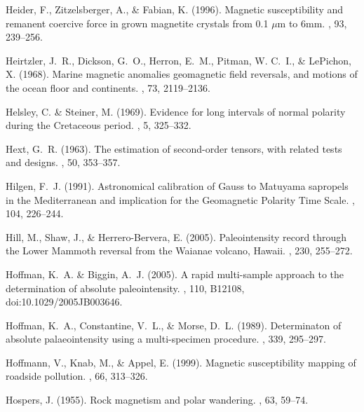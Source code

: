 \documentclass[11pt]{book}
\begin{document}
\begin{thebibliography}{}
Heider, F., Zitzelsberger, A., \& Fabian, K. (1996).
\newblock Magnetic susceptibility and remanent coercive force in grown
  magnetite crystals from 0.1 $\mu$m to 6mm.
, 93, 239--256.

Heirtzler, J.~R., Dickson, G.~O., Herron, E.~M., Pitman, W. C.~I., \& LePichon,
  X. (1968).
\newblock Marine magnetic anomalies geomagnetic field reversals, and motions of
  the ocean floor and continents.
, 73, 2119--2136.

Helsley, C. \& Steiner, M. (1969).
\newblock Evidence for long intervals of normal polarity during the Cretaceous
  period.
, 5, 325--332.

Hext, G.~R. (1963).
\newblock The estimation of second-order tensors, with related tests and
  designs.
, 50, 353--357.

Hilgen, F.~J. (1991).
\newblock Astronomical calibration of Gauss to Matuyama sapropels in the
  Mediterranean and implication for the Geomagnetic Polarity Time Scale.
, 104, 226--244.

Hill, M., Shaw, J., \& Herrero-Bervera, E. (2005).
\newblock Paleointensity record through the Lower Mammoth reversal from the
  Waianae volcano, Hawaii.
, 230, 255--272.

Hoffman, K.~A. \& Biggin, A.~J. (2005).
\newblock A rapid multi-sample approach to the determination of absolute
  paleointensity.
, 110, B12108, doi:10.1029/2005JB003646.

Hoffman, K.~A., Constantine, V.~L., \& Morse, D.~L. (1989).
\newblock Determinaton of absolute palaeointensity using a multi-specimen
  procedure.
, 339, 295--297.

Hoffmann, V., Knab, M., \& Appel, E. (1999).
\newblock Magnetic susceptibility mapping of roadside pollution.
, 66, 313--326.

Hospers, J. (1955).
\newblock Rock magnetism and polar wandering.
, 63, 59--74.


\end{thebibliography}
\end{document}
